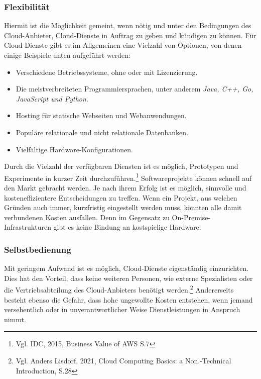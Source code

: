\subsubsection{Flexibilität}%
Hiermit ist die Möglichkeit gemeint, wenn nötig und unter den Bedingungen des Cloud-Anbieter,
Cloud-Dienste in Auftrag zu geben und kündigen zu können. Für Cloud-Dienste gibt es im Allgemeinen eine Vielzahl von Optionen, von denen einige Beispiele unten aufgeführt werden:
\begin{itemize}
\item
    Verschiedene Betriebssysteme, ohne oder mit Lizenzierung.
\item
    Die meistverbreiteten Programmiersprachen, unter anderem \textit{Java, C++, Go, JavaScript und Python}.{\cite{AMZ03}}
\item
    Hosting für statische Webseiten und Webanwendungen{\cite{AMZ04}}.
\item
    Populäre relationale und nicht relationale Datenbanken{\cite{AMZ10}}.           
\item
    Vielfältige Hardware-Konfigurationen.

\end{itemize}
Durch die Vielzahl der verfügbaren Diensten ist es möglich, Prototypen und Experimente in kurzer Zeit durchzuführen.\footnote{Vgl. IDC, 2015, Business Value of AWS S.7\cite{IDC01}} Softwareprojekte können schnell auf den Markt gebracht werden. Je nach ihrem Erfolg ist es möglich, sinnvolle und kosteneffizientere Entscheidungen zu treffen. Wenn ein Projekt, aus welchen Gründen auch immer, kurzfristig eingestellt werden muss, könnten alle damit verbundenen Kosten ausfallen. Denn im Gegensatz zu On-Premise-Infrastrukturen gibt es keine Bindung an kostspielige Hardware.

\subsubsection{Selbstbedienung}
Mit geringem Aufwand ist es möglich, Cloud-Dienste eigenständig einzurichten. Dies hat den Vorteil, dass keine weiteren Personen, wie externe Spezialisten oder die Vertriebsabteilung des Cloud-Anbieters  benötigt werden.\footnote{Vgl. Anders Lisdorf, 2021, Cloud Computing Basics: a Non.-Technical Introduction, S.28\cite{CCB}}
Andererseits besteht ebenso die Gefahr, dass hohe ungewollte Kosten entstehen, wenn jemand versehentlich oder in unverantwortlicher Weise Dienstleistungen in Anspruch nimmt.    

